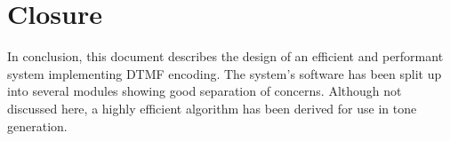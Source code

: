 \documentclass[11pt,a4paper,twocolumn]{scrartcl}
\begin{document}
\section{Closure}

In conclusion, this document describes the design of an efficient and performant system implementing DTMF encoding. The system's software has been split up
into several modules showing good separation of concerns. Although not discussed here, a highly efficient algorithm has been derived for use in tone generation.



\end{document}
